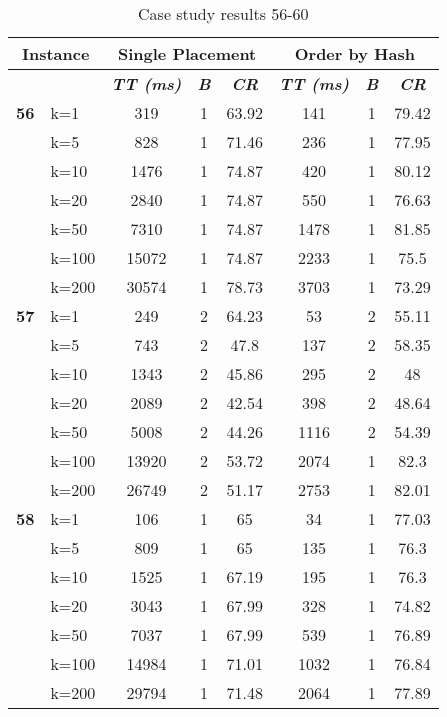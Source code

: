    \begin{table}[htbp]
    \caption{Case study results 56-60}
    \centering
    \begin{tabular}{|l|l|c|c|c|c|c|c|}
    \hline
    \multicolumn{ 2}{|c|}{\textbf{Instance}} & \multicolumn{ 3}{c|}{\textbf{Single Placement}} & \multicolumn{ 3}{c|}{\textbf{Order by Hash}} \\ \hline
    \multicolumn{ 2}{|l|}{} & \textbf{\textit{TT (ms)}} & \textbf{\textit{B}} & \textbf{\textit{CR}} & \textbf{\textit{TT (ms)}} & \textbf{\textit{B}} & \textbf{\textit{CR}} \\ \hline
    \multicolumn{1}{|r|}{\textbf{56}} & k=1 & 319 & 1 & 63.92 & 141 & 1 & 79.42 \\ 
     & k=5 & 828 & 1 & 71.46 & 236 & 1 & 77.95 \\ 
     & k=10 & 1476 & 1 & 74.87 & 420 & 1 & 80.12 \\ 
     & k=20 & 2840 & 1 & 74.87 & 550 & 1 & 76.63 \\ 
     & k=50 & 7310 & 1 & 74.87 & 1478 & 1 & 81.85 \\ 
     & k=100 & 15072 & 1 & 74.87 & 2233 & 1 & 75.5 \\ 
     & k=200 & 30574 & 1 & 78.73 & 3703 & 1 & 73.29 \\ \hline
    \multicolumn{1}{|r|}{\textbf{57}} & k=1 & 249 & 2 & 64.23 & 53 & 2 & 55.11 \\ 
     & k=5 & 743 & 2 & 47.8 & 137 & 2 & 58.35 \\ 
     & k=10 & 1343 & 2 & 45.86 & 295 & 2 & 48 \\ 
     & k=20 & 2089 & 2 & 42.54 & 398 & 2 & 48.64 \\ 
     & k=50 & 5008 & 2 & 44.26 & 1116 & 2 & 54.39 \\ 
     & k=100 & 13920 & 2 & 53.72 & 2074 & 1 & 82.3 \\ 
     & k=200 & 26749 & 2 & 51.17 & 2753 & 1 & 82.01 \\ \hline
    \multicolumn{1}{|r|}{\textbf{58}} & k=1 & 106 & 1 & 65 & 34 & 1 & 77.03 \\ 
     & k=5 & 809 & 1 & 65 & 135 & 1 & 76.3 \\ 
     & k=10 & 1525 & 1 & 67.19 & 195 & 1 & 76.3 \\ 
     & k=20 & 3043 & 1 & 67.99 & 328 & 1 & 74.82 \\ 
     & k=50 & 7037 & 1 & 67.99 & 539 & 1 & 76.89 \\ 
     & k=100 & 14984 & 1 & 71.01 & 1032 & 1 & 76.84 \\ 
     & k=200 & 29794 & 1 & 71.48 & 2064 & 1 & 77.89 \\ \hline

\end{tabular}
\end{table}
